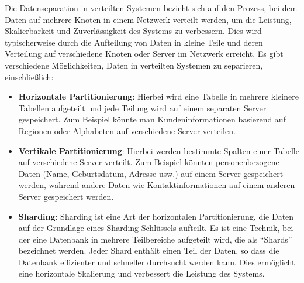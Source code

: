 \documentclass[../vs-script-first-v01.tex]{subfiles}
\begin{document}
Die Datenseparation in verteilten Systemen bezieht sich auf den Prozess, bei dem Daten auf mehrere Knoten in einem Netzwerk verteilt werden, um die Leistung, Skalierbarkeit und Zuverlässigkeit des Systems zu verbessern. Dies wird typischerweise durch die Aufteilung von Daten in kleine Teile und deren Verteilung auf verschiedene Knoten oder Server im Netzwerk erreicht.
Es gibt verschiedene Möglichkeiten, Daten in verteilten Systemen zu separieren, einschließlich:
\begin{itemize}
\item \textbf{Horizontale Partitionierung}: Hierbei wird eine Tabelle in mehrere kleinere Tabellen aufgeteilt und jede Teilung wird auf einem separaten Server gespeichert. Zum Beispiel könnte man Kundeninformationen basierend auf Regionen oder Alphabeten auf verschiedene Server verteilen.
\item \textbf{Vertikale Partitionierung}: Hierbei werden bestimmte Spalten einer Tabelle auf verschiedene Server verteilt. Zum Beispiel könnten personenbezogene Daten (Name, Geburtsdatum, Adresse usw.) auf einem Server gespeichert werden, während andere Daten wie Kontaktinformationen auf einem anderen Server gespeichert werden.
\item \textbf{Sharding}:  Sharding ist eine Art der horizontalen Partitionierung, die Daten auf der Grundlage eines Sharding-Schlüssels aufteilt. Es ist eine Technik, bei der eine Datenbank in mehrere Teilbereiche aufgeteilt wird, die als \enquote{Shards} bezeichnet werden. Jeder Shard enthält einen Teil der Daten, so dass die Datenbank effizienter und schneller durchsucht werden kann. Dies ermöglicht eine horizontale Skalierung und verbessert die Leistung des Systems. 


\end{itemize}
\end{document}
